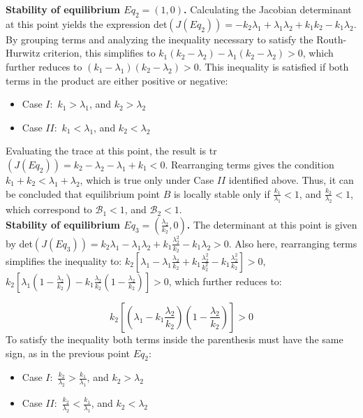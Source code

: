 \noindent\textbf{Stability of equilibrium $Eq_2=(1,0)$.} Calculating the Jacobian determinant at this point yields the expression det$(J(Eq_2))= - k_2 \lambda_1 + \lambda_1 \lambda_2 + k_1 k_2 - k_1 \lambda_2$. By grouping terms and analyzing the inequality necessary to satisfy the Routh-Hurwitz criterion, this simplifies to $k_1 (k_2 - \lambda_2) - \lambda_1(k_2 - \lambda_2) > 0$, which further reduces to $(k_1 - \lambda_1) (k_2 - \lambda_2) >0$.
This inequality is satisfied if both terms in the product are either positive or negative:
\begin{itemize}
	\item Case $I:$ $k_1 > \lambda_1$, and $k_2 > \lambda_2$
	\item Case $II:$ $k_1 < \lambda_1$, and $k_2 < \lambda_2$
\end{itemize}
Evaluating the trace at this point, the result is tr$(J(Eq_2)) = k_2 - \lambda_2 - \lambda_1 + k_1 < 0 $. Rearranging terms gives the condition $k_1 + k_2 < \lambda_1 + \lambda_2$, which is true only under Case $II$ identified above. 
Thus, it can be concluded that equilibrium point $B$ is locally stable only if $\frac{k_1}{\lambda_1} <1$, and  $\frac{k_2}{\lambda_2} <1$, which correspond to $\mathcal{B}_1 < 1$, and $\mathcal{B}_2 <1$.\\

\noindent\textbf{Stability of equilibrium $Eq_3=(\frac{\lambda_2}{k_2},0)$.} The determinant at this point is given by det$(J(Eq_3)) = k_2 \lambda_1 - \lambda_1 \lambda_2 + k_1 \frac{\lambda_2^2}{k_2} - k_1 \lambda_2 > 0 $. Also here, rearranging terms simplifies the inequality to: $k_2 [\lambda_1 -\lambda_1 \frac{\lambda_2}{k_2} + k_1 \frac{\lambda_2^2}{k_2^2} - k_1 \frac{\lambda_2^2}{k_2}] >0$, $ k_2 [\lambda_1 ( 1 -  \frac{\lambda_2}{k_2}) - k_1 \frac{\lambda_2}{k_2} (1 - \frac{\lambda_2}{k_2})] >0$, which further reduces to:

\[
 k_2 \left[\left(\lambda_1 - k_1 \frac{\lambda_2}{k_2}\right)\left(1 - \frac{\lambda_2}{k_2}\right)\right] >0
\]
To satisfy the inequality both terms inside the parenthesis must have the same sign, as in the previous point $Eq_2$:
\begin{itemize}
	\item Case $I:$ $\frac{k_2}{\lambda_2} > \frac{k_1}{\lambda_1} $, and $k_2 > \lambda_2$
 	\item Case $II:$ $\frac{k_2}{\lambda_2} < \frac{k_1}{\lambda_1} $, and $k_2 < \lambda_2$
\end{itemize}

